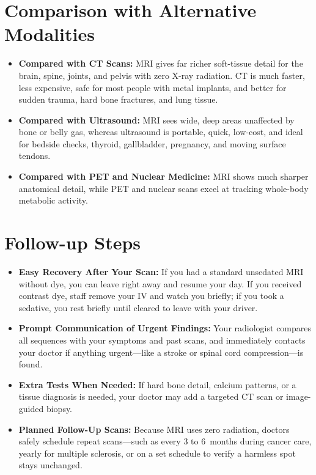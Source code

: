 \section{Comparison with Alternative Modalities}
\begin{itemize}
\item \textbf{Compared with CT Scans:} MRI gives far richer soft-tissue detail for the brain, spine, joints, and pelvis with zero X-ray radiation. CT is much faster, less expensive, safe for most people with metal implants, and better for sudden trauma, hard bone fractures, and lung tissue.
\item \textbf{Compared with Ultrasound:} MRI sees wide, deep areas unaffected by bone or belly gas, whereas ultrasound is portable, quick, low-cost, and ideal for bedside checks, thyroid, gallbladder, pregnancy, and moving surface tendons.
\item \textbf{Compared with PET and Nuclear Medicine:} MRI shows much sharper anatomical detail, while PET and nuclear scans excel at tracking whole-body metabolic activity.
\end{itemize}

\section{Follow-up Steps}
\begin{itemize}
\item \textbf{Easy Recovery After Your Scan:} If you had a standard unsedated MRI without dye, you can leave right away and resume your day. If you received contrast dye, staff remove your IV and watch you briefly; if you took a sedative, you rest briefly until cleared to leave with your driver.
\item \textbf{Prompt Communication of Urgent Findings:} Your radiologist compares all sequences with your symptoms and past scans, and immediately contacts your doctor if anything urgent---like a stroke or spinal cord compression---is found.
\item \textbf{Extra Tests When Needed:} If hard bone detail, calcium patterns, or a tissue diagnosis is needed, your doctor may add a targeted CT scan or image-guided biopsy.
\item \textbf{Planned Follow-Up Scans:} Because MRI uses zero radiation, doctors safely schedule repeat scans---such as every 3 to 6~months during cancer care, yearly for multiple sclerosis, or on a set schedule to verify a harmless spot stays unchanged.
\end{itemize}

